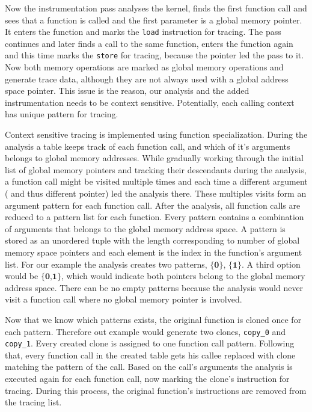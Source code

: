 Now the instrumentation pass analyses the kernel, finds the first function call and sees that a function is called and the first
parameter is a global memory pointer. It enters the function and marks the \verb|load| instruction for tracing. The pass continues and later finds a call to the same function, enters the function again and this time marks the \verb|store| for tracing, because the pointer
led the pass to it. Now both memory operations are marked as global memory operations and generate trace data, although they are not always used with a global address space pointer. This issue is the reason, our analysis and the added
instrumentation needs to be context sensitive. Potentially, each calling context has unique pattern for tracing.

Context sensitive tracing is implemented using function specialization. During the analysis a table keeps track of each function call, and which of
it's arguments belongs to global memory addresses. While gradually working through the initial list of  global memory pointers and tracking their descendants during the analysis, a function call might be visited multiple times and each time a different argument ( and thus different pointer) led the analysis there. These multiples visits form an argument pattern for each function call. After the analysis, all function calls are reduced
to a pattern list for each function. Every pattern contains a combination of arguments that belongs to the global memory address space. A pattern is stored as an unordered tuple with the length corresponding
to number of global memory space pointers and each element is the index in the function's argument list. 
For our example the analysis creates two patterns, $\textbf{\{0\}, \{1\}}$. A third option would be 
 $\textbf{\{0,1\}}$, which would indicate both pointers belong to the global memory address space.
There can be no empty patterns because the analysis would never visit a function call where no global memory pointer is involved.

Now that we know which patterns exists, the original function is cloned once for each pattern. Therefore out example would generate two clones, \verb|copy_0| and \verb|copy_1|. Every created clone is assigned to one function call pattern. Following that, every function call in the created table gets his callee replaced with clone matching the pattern of the call. Based on the call's arguments the analysis is executed again for each function call, now marking the clone's instruction for tracing. During this process, the original function's instructions are removed from the tracing list.

